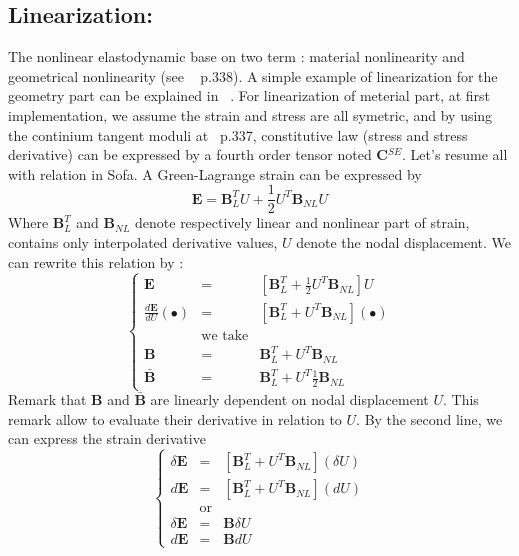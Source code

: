 \documentclass[a4paper,10pt]{article}
\begin{document}
\subsection{Linearization: }
The nonlinear elastodynamic base on two term : material nonlinearity and geometrical nonlinearity (see  ~\cite{FEMBook} p.338). A simple example of linearization for the geometry part can be explained in ~\cite{NonlinearGeo}. For linearization of meterial part, at first implementation, we assume the strain and stress are all symetric, and by using the continium tangent moduli at ~\cite{NonlinearGeo}p.337, constitutive law (stress and stress derivative) can be expressed by a fourth order tensor noted \textbf{C}$^{SE}$. Let's resume all with relation in Sofa. A Green-Lagrange strain can be expressed by  
\[
\textbf{E} = \textbf{B}^T_L U + \frac{1}{2} U^T \textbf{B}_{NL}  U             
\]
Where $\textbf{B}^T_L$ and $\textbf{B}_{NL}$ denote respectively linear and nonlinear part of strain, contains only interpolated derivative values, $U$ denote the nodal displacement. We can rewrite this relation by : 
\[
\left\{ 
\begin{array}{rcl}
\textbf{E}                      &=& [ \textbf{B}^T_L + \frac{1}{2} U^T \textbf{B}_{NL} ] U  \\  
\frac{d\textbf{E}}{dU}(\bullet) &=& [ \textbf{B}^T_L +  U^T \textbf{B}_{NL} ] (\bullet)     \\
            &\text{we take} &                                                               \\
      \textbf{B}   &=&  \textbf{B}^T_L +  U^T \textbf{B}_{NL}                               \\ 
 \bar{\textbf{B}}  &=&  \textbf{B}^T_L +  U^T \frac{1}{2}\textbf{B}_{NL}           
\end{array}\right.
\]
Remark that $\textbf{B}$ and $\bar{\textbf{B}}$ are linearly dependent on nodal displacement $U$. This remark allow to evaluate their derivative in relation to $U$. By the second line, we can express the strain derivative 
\[
\left\{ 
\begin{array}{rcl}
\delta \textbf{E}  &=& [ \textbf{B}^T_L +  U^T \textbf{B}_{NL} ] (\delta U)                 \\  
d \textbf{E}       &=& [ \textbf{B}^T_L +  U^T \textbf{B}_{NL} ] (dU)                       \\
            &\text{or} &                                                                    \\
\delta \textbf{E}  &=& \textbf{B} \delta U                                                  \\  
d \textbf{E}       &=& \textbf{B} dU                        
\end{array}\right.
\]
\end{document}
